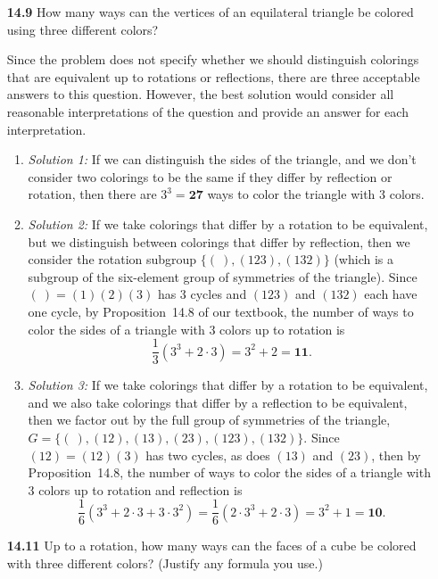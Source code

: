 \documentclass[12pt,reqno]{amsart}
\newcommand{\<}{\ensuremath{\langle}}
\renewcommand{\>}{\ensuremath{\rangle}}
\begin{document}
\begin{enumerate}
\bigskip

\item[{\bf 14.9}]
How many ways can the vertices of an equilateral triangle be colored
using three different colors? 

\medskip

Since the problem does not specify whether we should distinguish colorings that
are equivalent up to rotations or reflections, there are three acceptable
answers to this question.  However, the best solution would consider all
reasonable interpretations of the question and provide an answer for each
interpretation. 

\begin{enumerate}
\item \emph{Solution 1:}
If we can distinguish the sides of the triangle, and we don't consider two
colorings to be the same if they differ by reflection or rotation, then there
are $3^3 = \mathbf{27}$ ways to color the triangle with 3 colors.

\item \emph{Solution 2:} If we take colorings that differ by a rotation to
  be equivalent, but we distinguish between colorings that differ by reflection,
  then we consider the rotation subgroup $\{(~), (123), (132)\}$ (which is a
  subgroup of the six-element group of symmetries of the triangle).  Since 
  $(~) = (1)(2)(3)$ has 3 cycles and $(123)$ and $(132)$ each have one cycle, by
  Proposition~14.8 of our textbook, the number of ways to color the sides of a
  triangle with 3 colors up to rotation is
  \[
  \frac{1}{3}(3^3 + 2\cdot 3) = 3^2 + 2 = \mathbf{11}.
  \]

\item \emph{Solution 3:} If we take colorings that differ by a rotation to
  be equivalent, and we also take colorings that differ by a reflection to be
  equivalent, then we factor out by the full group of symmetries of
  the triangle, $G = \{(~), (12), (13), (23), (123), (132)\}$.  Since 
  $(12) = (12)(3)$ has two cycles, as does $(13)$ and $(23)$, then by
  Proposition~14.8, the number of ways to color the sides of a
  triangle with 3 colors up to rotation and reflection is
  \[
  \frac{1}{6}(3^3 + 2\cdot 3 + 3\cdot 3^2) = \frac{1}{6}(2\cdot 3^3 + 2\cdot 3)
  = 3^2 + 1 = \mathbf{10}.
  \]
\end{enumerate}

\bigskip

\item[{\bf 14.11}]
Up to a rotation, how many ways can the faces of a cube be colored
with three different colors?  (Justify any formula you use.)


\end{enumerate}
\end{document}
